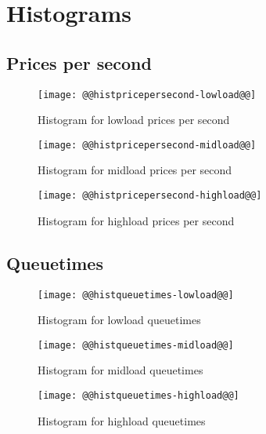 \documentclass[11pt]{article}
\begin{document}
\newpage
\section{Histograms}

\subsection{Prices per second}
\begin{figure}[htbp]
  \begin{center}
    \texttt{[image: @@histpricepersecond-lowload@@]}
    \caption{Histogram for lowload prices per second}
    \label{fig:histpricepersecond-lowload}
  \end{center}
\end{figure}
\begin{figure}[htbp]
  \begin{center}
    \texttt{[image: @@histpricepersecond-midload@@]}
    \caption{Histogram for midload prices per second}
    \label{fig:histpricepersecond-midload}
  \end{center}
\end{figure}
\begin{figure}[htbp]
  \begin{center}
    \texttt{[image: @@histpricepersecond-highload@@]}
    \caption{Histogram for highload prices per second}
    \label{fig:histpricepersecond-highload}
  \end{center}
\end{figure}

\newpage
\subsection{Queuetimes}
\begin{figure}[htbp]
  \begin{center}
    \texttt{[image: @@histqueuetimes-lowload@@]}
    \caption{Histogram for lowload queuetimes}
    \label{fig:histqueuetimes-lowload}
  \end{center}
\end{figure}
\begin{figure}[htbp]
  \begin{center}
    \texttt{[image: @@histqueuetimes-midload@@]}
    \caption{Histogram for midload queuetimes}
    \label{fig:histqueuetimes-midload}
  \end{center}
\end{figure}
\begin{figure}[htbp]
  \begin{center}
    \texttt{[image: @@histqueuetimes-highload@@]}
    \caption{Histogram for highload queuetimes}
    \label{fig:histqueuetimes-highload}
  \end{center}
\end{figure}
\end{document}
